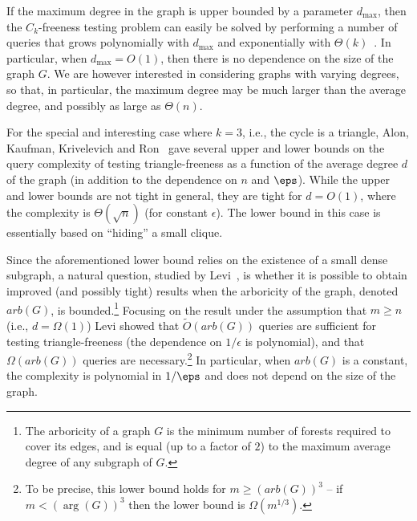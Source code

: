 If the maximum degree in the graph is upper bounded by a parameter $d_{\max}$, then the $C_k$-freeness testing problem can easily be solved by performing a number of queries that grows polynomially with $d_{\max}$ and exponentially with $\Theta(k)$~\cite{GR-bound}. 
In particular, when $d_{\max} = O(1)$, then there is no dependence on the size of the graph $G$. 
We are however interested in considering graphs with varying degrees, so that, in particular, the maximum degree may be   much larger than the average degree, and possibly as large as $\Theta(n)$.


For the special and interesting case where $k=3$, i.e., the cycle is a triangle,  Alon, Kaufman, Krivelevich and Ron~\cite{AKKR08} gave several upper and lower bounds on the query complexity of testing triangle-freeness as a function of the average degree $d$ of the graph (in addition to the dependence on $n$ and $\eps$).
While the upper and lower bounds are not tight  in general, they are tight for $d=O(1)$, where the complexity is $\Theta(\sqrt{n})$ (for constant $\epsilon$). 
The lower bound in this case is essentially based on ``hiding'' a small clique. 


Since the aforementioned lower bound relies on the existence of a small dense subgraph, a natural question, studied by Levi~\cite{Reut}, is whether it is possible to obtain improved (and possibly tight) results when the arboricity of the graph, denoted $arb(G)$, is bounded.\footnote{The arboricity of a graph $G$ is the minimum number of forests required to cover its edges, and is equal (up to a factor of $2$) to the maximum average degree of any subgraph of $G$.} Focusing on the result under the assumption that $m\geq n$ (i.e., $d= \Omega(1)$) Levi showed that  
$\widetilde{O}(arb(G))$  queries are sufficient for testing triangle-freeness (the dependence on $1/\epsilon$ is polynomial), and that $\Omega(arb(G))$ queries are necessary.\footnote{To be precise, this lower bound holds for $m\geq (arb(G))^3$ -- if $m< (\arg(G))^3$ then the lower bound is $\Omega(m^{1/3})$. }
In particular, when $arb(G)$ is a constant, the complexity is polynomial in $1/\eps$ and does not depend on the size of the graph.




